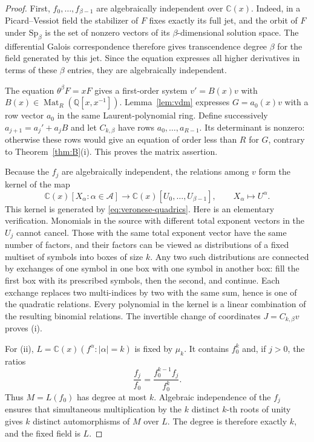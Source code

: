\documentclass[11pt]{amsart}
\theoremstyle{definition}
\newcommand{\C}{\mathbb C}
\newcommand{\Q}{\mathbb Q}
\newcommand{\Sp}{\mathrm{Sp}}
\begin{document}
\begin{proof}
First, $f_0,\ldots,f_{\beta-1}$ are algebraically independent over
$\C(x)$.  Indeed, in a Picard--Vessiot field the stabilizer of $F$
fixes exactly its full jet, and the orbit of $F$ under
$\Sp_\beta$ is the set of nonzero vectors of its $\beta$-dimensional
solution space.  The differential Galois correspondence therefore
gives transcendence degree $\beta$ for the field generated by this
jet.  Since the equation expresses all higher derivatives in terms
of these $\beta$ entries, they are algebraically independent.

The equation $\theta^\beta F=xF$ gives a first-order system
$v'=B(x)v$ with $B(x)\in\operatorname{Mat}_R(\Q[x,x^{-1}])$.
Lemma~\ref{lem:vdm} expresses $G=a_0(x)v$ with a row vector
$a_0$ in the same Laurent-polynomial ring.  Define successively
$a_{j+1}=a_j'+a_jB$ and let $C_{k,\beta}$ have rows
$a_0,\ldots,a_{R-1}$.  Its determinant is nonzero: otherwise
these rows would give an equation of order less than $R$ for $G$,
contrary to Theorem~\ref{thm:B}(i).  This proves the matrix assertion.

Because the $f_j$ are algebraically independent, the relations among
$v$ form the kernel of the map
\[
 \C(x)[X_\alpha:\alpha\in\mathcal A]
 \longrightarrow \C(x)[U_0,\ldots,U_{\beta-1}],
 \qquad X_\alpha\longmapsto U^\alpha.
\]
This kernel is generated by \eqref{eq:veronese-quadrics}.  Here is an
elementary verification.  Monomials in the source with different
total exponent vectors in the $U_j$ cannot cancel.  Those with the
same total exponent vector have the same number of factors, and
their factors can be viewed as distributions of a fixed multiset
of symbols into boxes of size $k$.  Any two such distributions are
connected by exchanges of one symbol in one box with one symbol
in another box: fill the first box with its prescribed symbols,
then the second, and continue.  Each exchange replaces two
multi-indices by two with the same sum, hence is one of the
quadratic relations.  Every polynomial in the kernel is a linear
combination of the resulting binomial relations.  The invertible
change of coordinates $J=C_{k,\beta}v$ proves (i).

For (ii), $L=\C(x)(f^\alpha:|\alpha|=k)$ is fixed by $\mu_k$.
It contains $f_0^k$ and, if $j>0$, the ratios
\[
 \frac{f_j}{f_0}
 =\frac{f_0^{k-1}f_j}{f_0^k}.
\]
Thus $M=L(f_0)$ has degree at most $k$.  Algebraic independence of
the $f_j$ ensures that simultaneous multiplication by the $k$
distinct $k$-th roots of unity gives $k$ distinct automorphisms of
$M$ over $L$.  The degree is therefore exactly $k$, and the fixed
field is $L$.
\end{proof}
\end{document}
